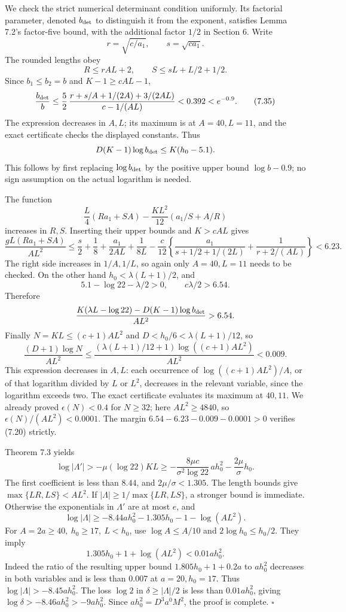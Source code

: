 \documentclass[
  11pt,
  a4paper,
]{article}
\begin{document}
We check the strict numerical determinant condition uniformly. Its
factorial parameter, denoted \(b_{\rm det}\) to distinguish it from the
exponent, satisfies Lemma 7.2's factor-five bound, with the additional
factor \(1/2\) in Section 6. Write \[
r=\sqrt{c/a_1},\qquad s=\sqrt{ca_1}.
\] The rounded lengths obey \[
R\le rAL+2,\qquad S\le sL+L/2+1/2.
\] Since \(b_1\le b_2=b\) and \(K-1\ge cAL-1\), \[
\frac{b_{\rm det}}b
\le\frac52\,
\frac{r+s/A+1/(2A)+3/(2AL)}{c-1/(AL)}
<0.392<e^{-0.9}. \tag{7.35}
\] The expression decreases in \(A,L\); its maximum is at \(A=40,L=11\),
and the exact certificate checks the displayed constants. Thus \[
D(K-1)\log b_{\rm det}\le K(h_0-5.1).
\] This follows by first replacing \(\log b_{\rm det}\) by the positive
upper bound \(\log b-0.9\); no sign assumption on the actual logarithm
is needed.

The function \[
\frac L4(Ra_1+SA)-\frac{KL^2}{12}(a_1/S+A/R)
\] increases in \(R,S\). Inserting their upper bounds and \(K>cAL\)
gives \[
\frac{gL(Ra_1+SA)}{AL^2}
\le\frac s2+\frac18+\frac{a_1}{2AL}+\frac1{8L}
-\frac c{12}\left\{\frac{a_1}{s+1/2+1/(2L)}
+\frac1{r+2/(AL)}\right\}<6.23. \tag{7.36}
\] The right side increases in \(1/A,1/L\), so again only \(A=40,L=11\)
needs to be checked. On the other hand \(h_0<\lambda(L+1)/2\), and \[
5.1-\log22-\lambda/2>0,\qquad c\lambda/2>6.54.
\] Therefore \[
\frac{K(\lambda L-\log22)-D(K-1)\log b_{\rm det}}{AL^2}>6.54.
\] Finally \(N=KL\le(c+1)AL^2\) and \(D<h_0/6<\lambda(L+1)/12\), so \[
\frac{(D+1)\log N}{AL^2}
\le
\frac{(\lambda(L+1)/12+1)\log((c+1)AL^2)}{AL^2}
<0.009.
\] This expression decreases in \(A,L\): each occurrence of
\(\log((c+1)AL^2)/A\), or of that logarithm divided by \(L\) or \(L^2\),
decreases in the relevant variable, since the logarithm exceeds two. The
exact certificate evaluates its maximum at \(40,11\). We already proved
\(\epsilon(N)<0.4\) for \(N\ge32\); here \(AL^2\ge4840\), so
\(\epsilon(N)/(AL^2)<0.0001\). The margin \(6.54-6.23-0.009-0.0001>0\)
verifies (7.20) strictly.

Theorem 7.3 yields \[
\log|\Lambda'|>-\mu(\log22)KL
\ge-\frac{8\mu c}{\sigma^2\log22}\,ah_0^2
-\frac{2\mu}{\sigma}h_0.
\] The first coefficient is less than \(8.44\), and
\(2\mu/\sigma<1.305\). The length bounds give \(\max\{LR,LS\}<AL^2\). If
\(|\Lambda|\ge1/\max\{LR,LS\}\), a stronger bound is immediate.
Otherwise the exponentials in \(\Lambda'\) are at most \(e\), and \[
\log|\Lambda|\ge-8.44ah_0^2-1.305h_0-1-\log(AL^2).
\] For \(A=2a\ge40,\ h_0\ge17,\ L<h_0\), use \(\log A\le A/10\) and
\(2\log h_0\le h_0/2\). They imply \[
1.305h_0+1+\log(AL^2)<0.01ah_0^2.
\] Indeed the ratio of the resulting upper bound \(1.805h_0+1+0.2a\) to
\(ah_0^2\) decreases in both variables and is less than \(0.007\) at
\(a=20,h_0=17\). Thus \(\log|\Lambda|>-8.45ah_0^2\). The loss \(\log2\)
in \(\delta\ge|\Lambda|/2\) is less than \(0.01ah_0^2\), giving
\(\log\delta>-8.46ah_0^2>-9ah_0^2\). Since \(ah_0^2=D^3a^0M^2\), the
proof is complete. \(\square\)
\end{document}
